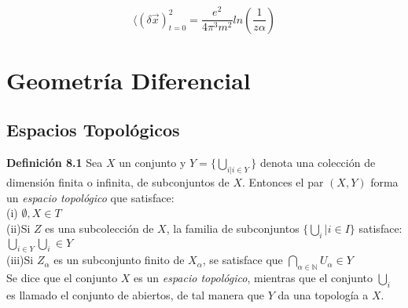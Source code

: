 \documentclass{report}
\begin{document}
\[ \langle ( \delta \overrightarrow{x})^2 _{t=0} = \frac{e^2}{4 \pi ^3 m^2 } ln (\frac{1}{z \alpha }) \]














\chapter{Geometría Diferencial}



\section{Espacios Topol\'ogicos}


\textbf{Definici\'on 8.1} Sea $X$ un conjunto y $Y = \lbrace \displaystyle \bigcup_{i | i \in Y} \rbrace$ denota una colecci\'on de dimensi\'on finita o infinita, de subconjuntos de $X$. Entonces el par $(X, Y)$ forma un \textit{espacio topol\'ogico} que satisface:\\


(i) $\emptyset , X \in T$\\

(ii)Si $Z$ es una subcolecci\'on de $X$, la familia de subconjuntos $\lbrace \displaystyle \bigcup_{i} |i \in I \rbrace$ satisface: $\displaystyle \bigcup_{i \in Y} \displaystyle \bigcup_{i} \in Y $\\

(iii)Si $Z_{\alpha}$ es un subconjunto finito de $X_{\alpha}$, se satisface que $\displaystyle \bigcap _{\alpha \in \mathbb{N}} U_{\alpha} \in Y$\\

Se dice que el conjunto $X$ es un \textit{espacio topol\'ogico}, mientras que el conjunto $\displaystyle \bigcup_{i}$ es llamado el conjunto de abiertos, de tal manera que $Y$ da una topolog\'ia a $X$.

\end{document}
